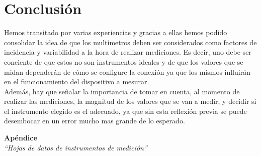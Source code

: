 \documentclass{article}
\begin{document}
\section{Conclusión}

	Hemos transitado por varias experiencias y gracias a ellas hemos podido consolidar la idea de que los multímetros deben ser considerados como factores de incidencia y variabilidad a la hora de realizar mediciones. Es decir, uno debe ser conciente de que estos no son instrumentos ideales y de que los valores que se midan dependerán de cómo se configure la conexión ya que los mismos influirán en el funcionamiento del dispositivo a mesurar. \\
\indent Además, hay que señalar la importancia  de tomar en cuenta, al momento de realizar las mediciones, la magnitud de los valores que se van a medir, y decidir si el instrumento elegido es el adecuado, ya que sin esta reflexión previa se puede desembocar en un error mucho mas grande de lo esperado.  





\newpage
\vspace*{4cm}
\begin{center}
	\textbf{\Huge{Apéndice}} \\
	\bigskip\bigskip
	\Large{\textit{``Hojas de datos de instrumentos de medición''}}
\end{center}
\end{document}
